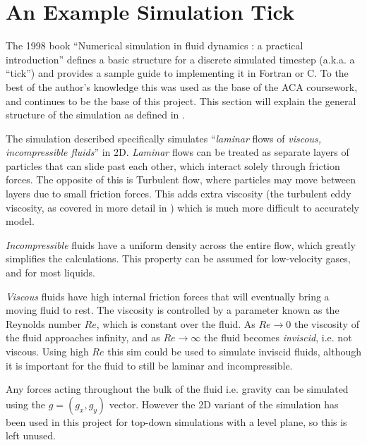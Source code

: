 \newcommand{\deltaT}[0]{$\delta{}t$}
\newcommand{\deltaX}[0]{$\delta{}x$}
\newcommand{\deltaY}[0]{$\delta{}y$}

\section{An Example Simulation Tick}\label{sec:Research:SimulationTick}
The 1998 book ``Numerical simulation in fluid dynamics : a practical introduction''\cite{book:griebel1998numerical} defines a basic structure for a discrete simulated timestep (a.k.a. a ``tick'') and provides a sample guide to implementing it in Fortran or C.
To the best of the author's knowledge this was used as the base of the ACA coursework, and continues to be the base of this project.
This section will explain the general structure of the simulation as defined in \cite{book:griebel1998numerical}.

The simulation described specifically simulates ``\emph{laminar} flows of \emph{viscous, incompressible fluids}''\cite{book:griebel1998numerical} in 2D.
\emph{Laminar} flows can be treated as separate layers of particles that can slide past each other, which interact solely through friction forces.
The opposite of this is Turbulent flow, where particles may move between layers due to small friction forces\cite{book:griebel1998numerical}.
This adds extra viscosity (the turbulent eddy viscosity, as covered in more detail in \cite{bird2006transport}) which is much more difficult to accurately model.

\emph{Incompressible} fluids have a uniform density across the entire flow, which greatly simplifies the calculations.
This property can be assumed for low-velocity gases, and for most liquids\cite{book:griebel1998numerical}.

\emph{Viscous} fluids have high internal friction forces that will eventually bring a moving fluid to rest.
The viscosity is controlled by a parameter known as the Reynolds number $Re$\cite{falkovich2018fluid}, which is constant over the fluid.
As $Re \to 0$ the viscosity of the fluid approaches infinity, and as $Re \to \infty$ the fluid becomes \emph{inviscid}, i.e. not viscous.
Using high $Re$ this sim could be used to simulate inviscid fluids, although it is important for the fluid to still be laminar and incompressible.

Any forces acting throughout the bulk of the fluid i.e. gravity can be simulated using the $g = (g_x, g_y)$ vector.
However the 2D variant of the simulation has been used in this project for top-down simulations with a level plane, so this is left unused.

